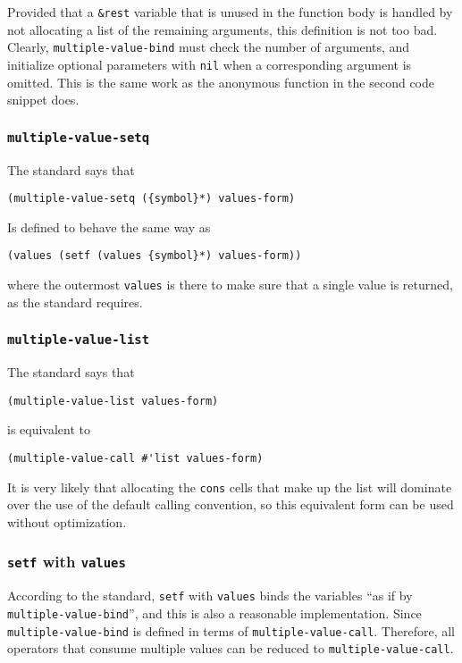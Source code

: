 Provided that a \texttt{\&rest} variable that is unused in the
function body is handled by not allocating a list of the remaining
arguments, this definition is not too bad.  Clearly,
\texttt{multiple-value-bind} must check the number of arguments, and
initialize optional parameters with \texttt{nil} when a corresponding
argument is omitted.  This is the same work as the anonymous function
in the second code snippet does.

\subsubsection{\texttt{multiple-value-setq}}

The standard says that

\begin{verbatim}
(multiple-value-setq ({symbol}*) values-form)
\end{verbatim}

Is defined to behave the same way as

\begin{verbatim}
(values (setf (values {symbol}*) values-form))
\end{verbatim}

where the outermost \texttt{values} is there to make sure that a
single value is returned, as the standard requires. 

\subsubsection{\texttt{multiple-value-list}}

The standard says that

\begin{verbatim}
(multiple-value-list values-form)
\end{verbatim}

is equivalent to

\begin{verbatim}
(multiple-value-call #'list values-form)
\end{verbatim}

It is very likely that allocating the \texttt{cons} cells that make up
the list will dominate over the use of the default calling convention,
so this equivalent form can be used without optimization. 

\subsubsection{\texttt{setf} with \texttt{values}}

According to the standard, \texttt{setf} with \texttt{values} binds
the variables ``as if by \texttt{multiple-value-bind}'', and this is
also a reasonable implementation.  Since \texttt{multiple-value-bind}
is defined in terms of \texttt{multiple-value-call}.  Therefore, all
operators that consume multiple values can be reduced to
\texttt{multiple-value-call}.

